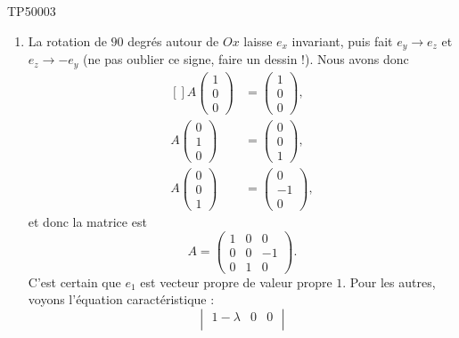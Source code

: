 \begin{corrige}{TP50003}
\begin{enumerate}
		\item
			La rotation de $90$ degrés autour de $Ox$ laisse $e_x$ invariant, puis fait $e_y\to e_z$ et $e_z\to -e_y$ (ne pas oublier ce signe, faire un dessin !). Nous avons donc
			\begin{equation}
				\begin{aligned}[]
					A\begin{pmatrix}
						1	\\ 
						0	\\ 
						0	
					\end{pmatrix}&=\begin{pmatrix}
						1	\\ 
						0	\\ 
						0	
					\end{pmatrix},\\
					A\begin{pmatrix}
						0	\\ 
						1	\\ 
						0	
					\end{pmatrix}&=\begin{pmatrix}
						0	\\ 
						0	\\ 
						1	
					\end{pmatrix},\\
					A\begin{pmatrix}
						0	\\ 
						0	\\ 
						1	
					\end{pmatrix}&=\begin{pmatrix}
						0	\\ 
						-1	\\ 
						0	
					\end{pmatrix},
				\end{aligned}
			\end{equation}
			et donc la matrice est
			\begin{equation}
				A=\begin{pmatrix}
					1	&	0	&	0	\\
					0	&	0	&	-1	\\
					0	&	1	&	0
				\end{pmatrix}.
			\end{equation}
			C'est certain que $e_1$ est vecteur propre de valeur propre $1$. Pour les autres, voyons l'équation caractéristique :
			\begin{equation}
				\begin{vmatrix}
					1-\lambda	&	0	&	0	\\

\end{vmatrix}
\end{equation}
\end{enumerate}
\end{corrige}
